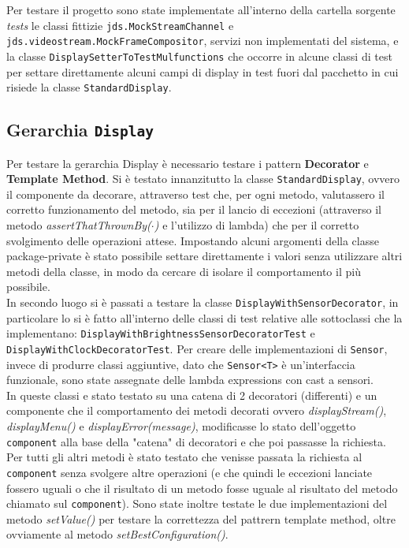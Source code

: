 \documentclass[a4paper,11pt]{article}
\begin{document}
	Per testare il progetto sono state implementate all'interno della cartella sorgente \textit{tests} le classi fittizie \texttt{jds.MockStreamChannel} e \texttt{jds.videostream.MockFrameCompositor}, servizi non implementati del sistema, e la classe \texttt{DisplaySetterToTestMulfunctions} che occorre in alcune classi di test per settare direttamente alcuni campi di display in test fuori dal pacchetto in cui risiede la classe \texttt{StandardDisplay}.
	
	\subsection{Gerarchia \texttt{Display}}
	Per testare la gerarchia Display è necessario testare i pattern \textbf{Decorator} e \textbf{Template Method}.
	Si è testato innanzitutto la classe \texttt{StandardDisplay}, ovvero il componente da decorare, attraverso test che, per ogni metodo, valutassero il corretto funzionamento del metodo, sia per il lancio di eccezioni (attraverso il metodo \textit{assertThatThrownBy($\cdot$)} e l'utilizzo di lambda) che per il corretto svolgimento delle operazioni attese. Impostando alcuni argomenti della classe package-private è stato possibile settare direttamente i valori senza utilizzare altri metodi della classe, in modo da cercare di isolare il comportamento il più possibile.\\
	In secondo luogo si è passati a testare la classe \texttt{DisplayWithSensorDecorator}, in particolare lo si è fatto all'interno delle classi di test relative alle sottoclassi che la implementano: \texttt{DisplayWithBrightnessSensorDecoratorTest} e \texttt{DisplayWithClockDecoratorTest}.
	Per creare delle implementazioni di \texttt{Sensor}, invece di produrre classi aggiuntive, dato che \texttt{Sensor<T>} è un'interfaccia funzionale, sono state assegnate delle lambda expressions con cast a sensori.\\
	In queste classi e stato testato su una catena di 2 decoratori (differenti) e un componente che il comportamento dei metodi decorati ovvero \textit{displayStream()}, \textit{displayMenu()} e \textit{displayError(message)}, modificasse lo stato dell'oggetto \texttt{component} alla base della "catena" di decoratori e che poi passasse la richiesta. Per tutti gli altri metodi è stato testato che venisse passata la richiesta al \texttt{component} senza svolgere altre operazioni (e che quindi le eccezioni lanciate fossero uguali o che il risultato di un metodo fosse uguale al risultato del metodo chiamato sul \texttt{component}).
	Sono state inoltre testate le due implementazioni del metodo \textit{setValue()} per testare la correttezza del pattrern template method, oltre ovviamente al metodo \textit{setBestConfiguration()}.
	
\end{document}
